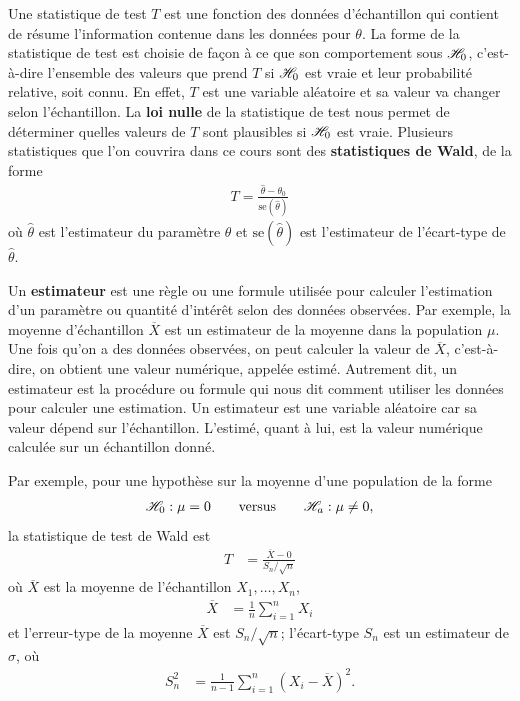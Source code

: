 \documentclass[
  11pt,
  letterpaper,
]{book}
\begin{document}
Une statistique de test \(T\) est une fonction des données d'échantillon qui contient de résume l'information contenue dans les données pour \(\theta\). La forme de la statistique de test est choisie de façon à ce que son comportement sous \(\mathscr{H}_0\), c'est-à-dire l'ensemble des valeurs que prend \(T\) si \(\mathscr{H}_0\) est vraie et leur probabilité relative, soit connu. En effet, \(T\) est une variable aléatoire et sa valeur va changer selon l'échantillon. La \textbf{loi nulle} de la statistique de test nous permet de déterminer quelles valeurs de \(T\) sont plausibles si \(\mathscr{H}_0\) est vraie. Plusieurs statistiques que l'on couvrira dans ce cours sont des \textbf{statistiques de Wald}, de la forme
\begin{align*}
T = \frac{\widehat{\theta} - \theta_0}{\mathrm{se}(\widehat{\theta})} 
\end{align*}
où \(\widehat{\theta}\) est l'estimateur du paramètre \(\theta\) et \(\mathrm{se}(\widehat{\theta})\) est l'estimateur de l'écart-type de \(\widehat{\theta}\).

Un \textbf{estimateur} est une règle ou une formule utilisée pour calculer l'estimation d'un paramètre ou quantité d'intérêt selon des données observées. Par exemple, la moyenne d'échantillon \(\overline{X}\) est un estimateur de la moyenne dans la population \(\mu\). Une fois qu'on a des données observées, on peut calculer la valeur de \(\overline{X}\), c'est-à-dire, on obtient une valeur numérique, appelée estimé. Autrement dit, un estimateur est la procédure ou formule qui nous dit comment utiliser les données pour calculer une estimation. Un estimateur est une variable aléatoire car sa valeur dépend sur l'échantillon. L'estimé, quant à lui, est la valeur numérique calculée sur un échantillon donné.

Par exemple, pour une hypothèse sur la moyenne d'une population de la forme
\begin{align*}
\mathscr{H}_0: \mu=0 \qquad \text{versus} \qquad \mathscr{H}_a:\mu \neq 0, 
\end{align*}
la statistique de test de Wald est
\begin{align*}
T &= \frac{\overline{X}-0}{S_n/\sqrt{n}}
\end{align*}
où \(\overline{X}\) est la moyenne de l'échantillon \(X_1, \ldots, X_n\),
\begin{align*}
\overline{X} &= \frac{1}{n} \sum_{i=1}^n X_i
\end{align*}
et l'erreur-type de la moyenne \(\overline{X}\) est \(S_n/\sqrt{n}\); l'écart-type \(S_n\) est un estimateur de \(\sigma\), où
\begin{align*}
S^2_n &= \frac{1}{n-1} \sum_{i=1}^n (X_i-\overline{X})^2.
\end{align*}
\end{document}

